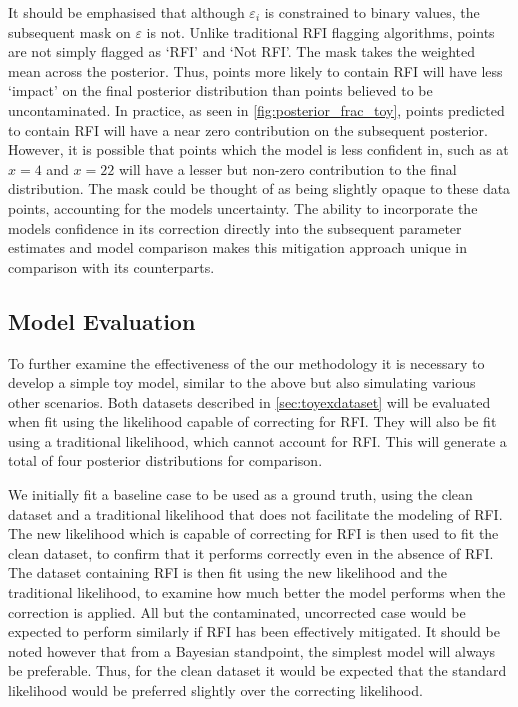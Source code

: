 \documentclass[fleqn,usenatbib]{mnras}
\begin{document}
It should be emphasised that although $\varepsilon_i$ is constrained to binary values, the subsequent mask on $\varepsilon$ is not. Unlike traditional RFI flagging algorithms, points are not simply flagged as  `RFI' and `Not RFI'. The mask takes the weighted mean across the posterior. Thus, points more likely to contain RFI will have less `impact' on the final posterior distribution than points believed to be uncontaminated. In practice, as seen in \cref{fig:posterior_frac_toy}, points predicted to contain RFI will have a near zero contribution on the subsequent posterior. However, it is possible that points which the model is less confident in, such as at $x=4$ and $x=22$ will have a lesser but non-zero contribution to the final distribution. The mask could be thought of as being slightly opaque to these data points, accounting for the models uncertainty. The ability to incorporate the models confidence in its correction directly into the subsequent parameter estimates and model comparison makes this mitigation approach unique in comparison with its counterparts. 
\subsection{Model Evaluation}
To further examine the effectiveness of the our methodology it is necessary to develop a simple toy model, similar to the above but also simulating various other scenarios. Both datasets described in \cref{sec:toyexdataset} will be evaluated when fit using the likelihood capable of correcting for RFI. They will also be fit using a traditional likelihood, which cannot account for RFI. This will generate a total of four posterior distributions for comparison. 

We initially fit a baseline case to be used as a ground truth, using the clean dataset and a traditional likelihood that does not facilitate the modeling of RFI. The new likelihood which is capable of correcting for RFI is then used to fit the clean dataset, to confirm that it performs correctly even in the absence of RFI. The dataset containing RFI is then fit using the new likelihood and the traditional likelihood, to examine how much better the model performs when the correction is applied. All but the contaminated, uncorrected case would be expected to perform similarly if RFI has been effectively mitigated. It should be noted however that from a Bayesian standpoint, the simplest model will always be preferable. Thus, for the clean dataset it would be expected that the standard likelihood would be preferred slightly over the correcting likelihood. 
\end{document}
